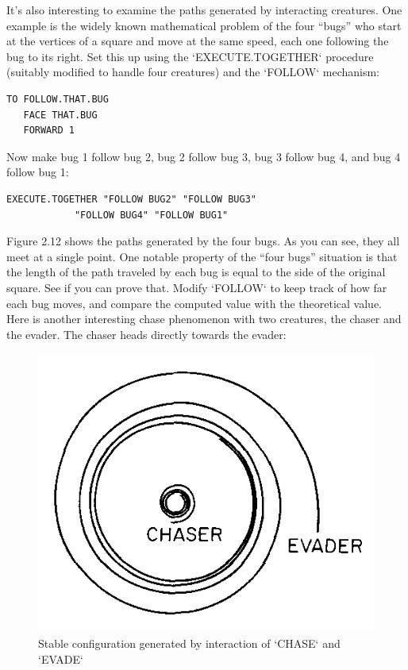 \documentclass{book}
\begin{document}
It's also interesting to examine the paths generated by interacting
creatures. One example is the widely known mathematical problem
of the four ``bugs'' who start at the vertices of a square and move at
the same speed, each one following the bug to its right. Set this up
using the \textsc{`EXECUTE.TOGETHER`} procedure (suitably modified to handle
four creatures) and the \textsc{`FOLLOW`} mechanism:

\begin{verbatim}
TO FOLLOW.THAT.BUG
   FACE THAT.BUG
   FORWARD 1
\end{verbatim}
Now make bug 1 follow bug 2, bug 2 follow bug 3, bug 3 follow bug 4,
and bug 4 follow bug 1:

\begin{verbatim}
EXECUTE.TOGETHER "FOLLOW BUG2" "FOLLOW BUG3" 
            "FOLLOW BUG4" "FOLLOW BUG1"
\end{verbatim}
Figure 2.12 shows the paths generated by the four bugs. As you can
see, they all meet at a single point. One notable property of the ``four
bugs'' situation is that the length of the path traveled by each bug is
equal to the side of the original square. See if you can prove that.
Modify \textsc{`FOLLOW`} to keep track of how far each bug moves, and compare
the computed value with the theoretical value.
Here is another interesting chase phenomenon with two creatures, the
chaser and the evader. The chaser heads directly towards the evader:

\begin{figure}
\begin{center}
\includegraphics[scale=1]{fig2-13}
\caption{Stable configuration generated by interaction of \textsc{`CHASE`} and \textsc{`EVADE`}}
\end{center}
\end{figure}
\end{document}
